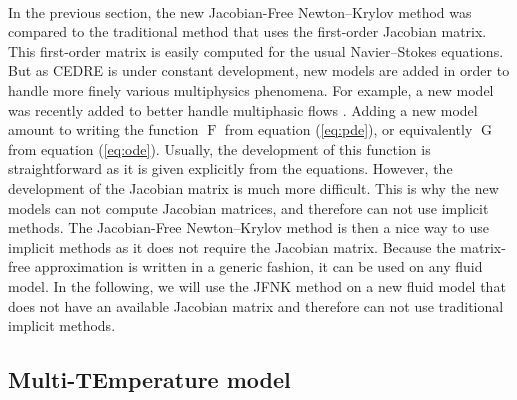     \paragraph{}
    In the previous section, the new Jacobian-Free Newton--Krylov method was compared to the traditional method that uses the first-order Jacobian matrix.
    This first-order matrix is easily computed for the usual Navier--Stokes equations.
    But as CEDRE is under constant development, new models are added in order to handle more finely various multiphysics phenomena.
    For example, a new model was recently added to better handle multiphasic flows \cite{Cordesse2020}.
    Adding a new model amount to writing the function $\operatorname{F}$ from equation (\ref{eq:pde}), or equivalently $\operatorname{G}$ from equation (\ref{eq:ode}).
    Usually, the development of this function is straightforward as it is given explicitly from the equations.
    However, the development of the Jacobian matrix is much more difficult.
    This is why the new models can not compute Jacobian matrices, and therefore can not use implicit methods.
    The Jacobian-Free Newton--Krylov method is then a nice way to use implicit methods as it does not require the Jacobian matrix.
    Because the matrix-free approximation is written in a generic fashion, it can be used on any fluid model.
    In the following, we will use the JFNK method on a new fluid model that does not have an available Jacobian matrix and therefore can not use traditional implicit methods.


    \subsection{Multi-TEmperature model}

